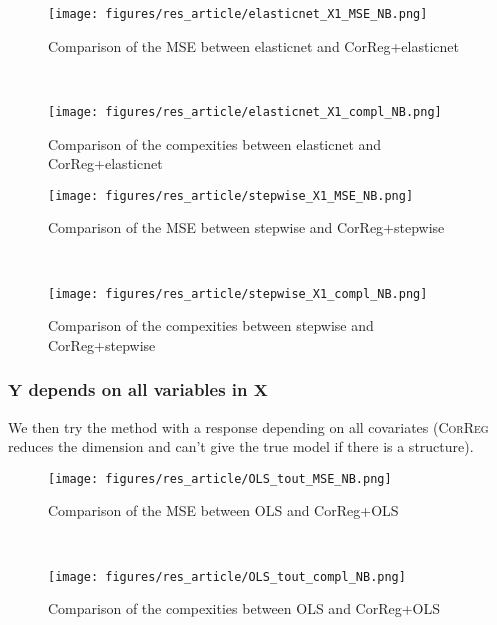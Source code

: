 \documentclass[12pt,a4paper]{report}
\begin{document}
 \begin{figure}[h!]
	\begin{minipage}[l]{.48\linewidth}
			\texttt{[image: figures/res\_article/elasticnet\_X1\_MSE\_NB.png]} 
			\caption{Comparison of the MSE between elasticnet and CorReg+elasticnet}
	\end{minipage} \
   \begin{minipage}[r]{.48\linewidth}
			\texttt{[image: figures/res\_article/elasticnet\_X1\_compl\_NB.png]} 
			\caption{Comparison of the compexities between elasticnet and CorReg+elasticnet} 
   \end{minipage}
\end{figure}

 \begin{figure}[h!]
	\begin{minipage}[l]{.48\linewidth}
			\texttt{[image: figures/res\_article/stepwise\_X1\_MSE\_NB.png]} 
			\caption{Comparison of the MSE between stepwise and CorReg+stepwise}
	\end{minipage} \
   \begin{minipage}[r]{.48\linewidth}
			\texttt{[image: figures/res\_article/stepwise\_X1\_compl\_NB.png]} 
			\caption{Comparison of the compexities between stepwise and CorReg+stepwise} 
   \end{minipage}
\end{figure}

\clearpage
	\subsubsection{$\boldsymbol{Y}$ depends on all variables in $\boldsymbol{X}$}	 	
We then try the method with a response depending on all covariates (\textsc{CorReg} reduces the dimension and can't give the true model if there is a structure). %
 
 
 \begin{figure}[h!]
	\begin{minipage}[l]{.48\linewidth}
			\texttt{[image: figures/res\_article/OLS\_tout\_MSE\_NB.png]} 
			\caption{Comparison of the MSE between OLS and CorReg+OLS}
	\end{minipage} \
   \begin{minipage}[r]{.48\linewidth}
			\texttt{[image: figures/res\_article/OLS\_tout\_compl\_NB.png]} 
			\caption{Comparison of the compexities between OLS and CorReg+OLS} 
   \end{minipage}
\end{figure}
 
\end{document}
